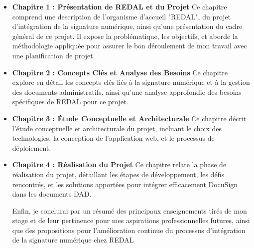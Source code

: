 \begin{itemize}
    

\item \textbf{Chapitre 1 : Présentation de REDAL et du Projet} Ce chapitre comprend une description de l’organisme d’accueil "REDAL", du projet d’intégration de la signature numérique, ainsi qu’une présentation du cadre général de ce projet. Il expose la problématique, les objectifs, et aborde la méthodologie appliquée pour assurer le bon déroulement de mon travail avec une planification de projet.

\item \textbf{Chapitre 2 : Concepts Clés et Analyse des Besoins} Ce chapitre explore en détail les concepts clés liés à la signature numérique et à la gestion des documents administratifs, ainsi qu’une analyse approfondie des besoins spécifiques de REDAL pour ce projet.

\item \textbf{Chapitre 3 : Étude Conceptuelle et Architecturale} Ce chapitre décrit l’étude conceptuelle et architecturale du projet, incluant le choix des technologies, la conception de l’application web, et le processus de déploiement.

\item \textbf{Chapitre 4 : Réalisation du Projet} Ce chapitre relate la phase de réalisation du projet, détaillant les étapes de développement, les défis rencontrés, et les solutions apportées pour intégrer efficacement DocuSign dans les documents DAD.

\quad
Enfin, je conclurai par un résumé des principaux enseignements tirés de mon stage et de leur pertinence pour mes aspirations professionnelles futures, ainsi que des propositions pour l'amélioration continue du processus d’intégration de la signature numérique chez REDAL

\end{itemize}

